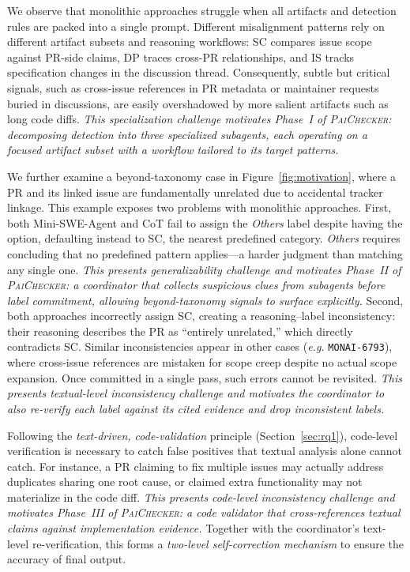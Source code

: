 \documentclass[sigconf, review, anonymous]{acmart}
\newcommand{\tool}{\textsc{PaiChecker}\xspace}
\newcommand{\eg}{\textit{e.g.}\xspace}
\begin{document}
We observe that monolithic approaches struggle when all artifacts and detection rules are packed into a single prompt. Different misalignment patterns rely on different artifact subsets and reasoning workflows: SC compares issue scope against PR-side claims, DP traces cross-PR relationships, and IS tracks specification changes in the discussion thread. Consequently, subtle but critical signals, such as cross-issue references in PR metadata or maintainer requests buried in discussions, are easily overshadowed by more salient artifacts such as long code diffs.  \textit{This specialization challenge motivates Phase~I of \tool: decomposing detection into three specialized subagents, each operating on a focused artifact subset with a workflow tailored to its target patterns.}

We further examine a beyond-taxonomy case in
  Figure~\ref{fig:motivation}, where a PR and its linked issue are
  fundamentally unrelated due to accidental tracker linkage. This
  example exposes two problems with monolithic approaches. First, both
  Mini-SWE-Agent and CoT fail to assign the \textit{Others} label
  despite having the option, defaulting instead to SC, the nearest
  predefined category. \textit{Others} requires concluding that no
  predefined pattern applies---a harder judgment than matching any
  single one. \textit{This presents generalizability challenge and motivates Phase~II of \tool: a
  coordinator that collects suspicious clues from subagents before label
  commitment, allowing beyond-taxonomy signals to surface explicitly.}
  Second, both approaches incorrectly assign SC, creating a
  reasoning--label inconsistency: their reasoning describes the PR as
  ``entirely unrelated,'' which directly contradicts SC. Similar inconsistencies appear in other cases (\eg
  \texttt{MONAI-6793}), where cross-issue references are mistaken for scope creep despite no actual
  scope expansion. Once committed in a single pass, such errors
  cannot be revisited. \textit{This presents textual-level inconsistency challenge and motivates the coordinator to also
  re-verify each label against its cited evidence and drop inconsistent
  labels.}

Following the \textit{text-driven, code-validation} principle
  (Section~\ref{sec:rq1}), code-level verification is necessary to
  catch false positives that textual analysis alone cannot catch. For
  instance, a PR claiming to fix multiple issues may actually address
  duplicates sharing one root cause, or claimed extra functionality may
  not materialize in the code diff. \textit{This presents code-level inconsistency challenge and motivates Phase~III of
  \tool: a code validator that cross-references textual claims against
  implementation evidence.} Together with the coordinator's text-level
  re-verification, this forms a \textit{two-level self-correction
  mechanism} to ensure the accuracy of final output.
\end{document}
